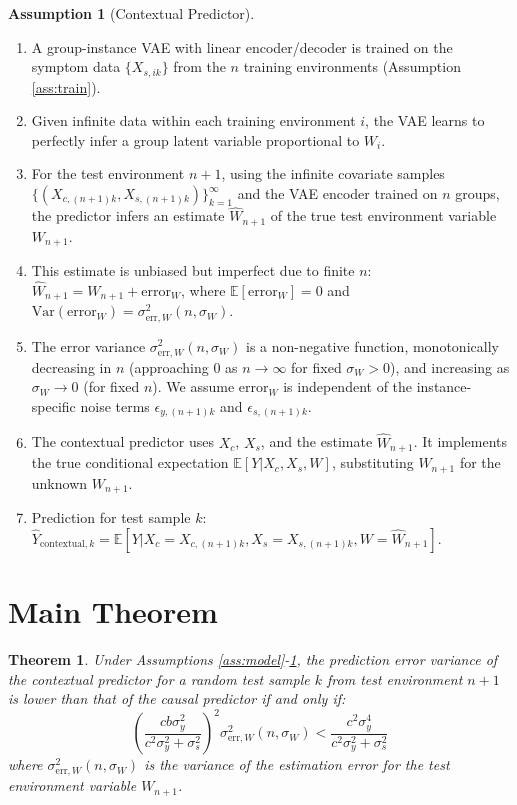 \documentclass{article}
\theoremstyle{plain}
\newtheorem{theorem}{Theorem}[section]
\theoremstyle{definition}
\newtheorem{assumption}{Assumption}[section]
\theoremstyle{remark}
\newcommand{\E}{\mathbb{E}}
\newcommand{\Var}{\text{Var}}
\begin{document}
\begin{assumption}[Contextual Predictor]\label{ass:contextual}
\begin{enumerate}
    \item A group-instance VAE with linear encoder/decoder is trained on the symptom data $\{X_{s,ik}\}$ from the $n$ training environments (Assumption \ref{ass:train}).
    \item Given infinite data within each training environment $i$, the VAE learns to perfectly infer a group latent variable proportional to $W_i$.
    \item For the test environment $n+1$, using the infinite covariate samples $\{ (X_{c,(n+1)k}, X_{s,(n+1)k}) \}_{k=1}^\infty$ and the VAE encoder trained on $n$ groups, the predictor infers an estimate $\hat{W}_{n+1}$ of the true test environment variable $W_{n+1}$.
    \item This estimate is unbiased but imperfect due to finite $n$: $\hat{W}_{n+1} = W_{n+1} + \text{error}_W$, where $\E[\text{error}_W] = 0$ and $\Var(\text{error}_W) = \sigma_{\text{err},W}^2(n, \sigma_W)$.
    \item The error variance $\sigma_{\text{err},W}^2(n, \sigma_W)$ is a non-negative function, monotonically decreasing in $n$ (approaching 0 as $n \to \infty$ for fixed $\sigma_W > 0$), and increasing as $\sigma_W \to 0$ (for fixed $n$). We assume $\text{error}_W$ is independent of the instance-specific noise terms $\epsilon_{y,(n+1)k}$ and $\epsilon_{s,(n+1)k}$.
    \item The contextual predictor uses $X_c$, $X_s$, and the estimate $\hat{W}_{n+1}$. It implements the true conditional expectation $\E[Y | X_c, X_s, W]$, substituting $\hat{W}_{n+1}$ for the unknown $W_{n+1}$.
    \item Prediction for test sample $k$: $\hat{Y}_{\text{contextual}, k} = \E[Y | X_c=X_{c,(n+1)k}, X_s=X_{s,(n+1)k}, W=\hat{W}_{n+1}]$.
\end{enumerate}
\end{assumption}

\section{Main Theorem}

\begin{theorem}\label{thm:main}
Under Assumptions \ref{ass:model}-\ref{ass:contextual}, the prediction error variance of the contextual predictor for a random test sample $k$ from test environment $n+1$ is lower than that of the causal predictor if and only if:
\begin{equation} \label{eq:condition}
\left( \frac{c b \sigma_y^2}{c^2\sigma_y^2 + \sigma_s^2} \right)^2 \sigma_{\text{err},W}^2(n, \sigma_W) < \frac{c^2 \sigma_y^4}{c^2\sigma_y^2 + \sigma_s^2}
\end{equation}
where $\sigma_{\text{err},W}^2(n, \sigma_W)$ is the variance of the estimation error for the test environment variable $W_{n+1}$.
\end{theorem}
\end{document}
